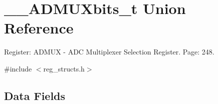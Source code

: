 \hypertarget{union_____a_d_m_u_xbits__t}{\section{\+\_\+\+\_\+\+A\+D\+M\+U\+Xbits\+\_\+t Union Reference}
\label{union_____a_d_m_u_xbits__t}
}


Register\+: A\+D\+M\+U\+X -\/ A\+D\+C Multiplexer Selection Register. Page\+: 248.  




{\ttfamily \#include $<$reg\+\_\+structs.\+h$>$}

\subsection*{Data Fields}
